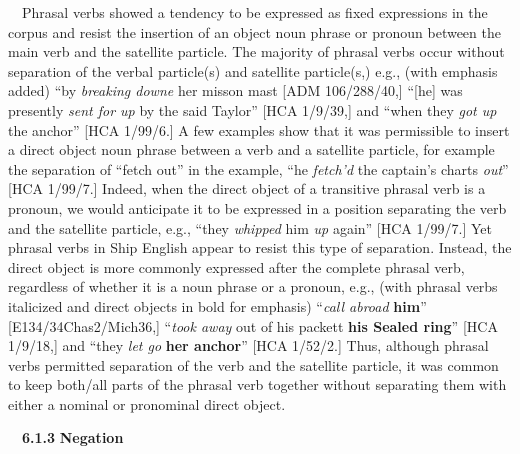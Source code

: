 \begin{styleStandard}
\ \ Phrasal verbs showed a tendency to be expressed as fixed expressions in the corpus and resist the insertion of an object noun phrase or pronoun between the main verb and the satellite particle. The majority of phrasal verbs occur without separation of the verbal particle(s) and satellite particle(s,) e.g., (with emphasis added) “by \textit{breaking downe} her misson mast{\textquotedbl} [ADM 106/288/40,] “[he] was presently \textit{sent for up} by the said Taylor” [HCA 1/9/39,] and “when they \textit{got up} the anchor” [HCA 1/99/6.] A few examples show that it was permissible to insert a direct object noun phrase between a verb and a satellite particle, for example the separation of “fetch out” in the example, “he \textit{fetch’d} the captain’s charts \textit{out}” [HCA 1/99/7.] Indeed, when the direct object of a transitive phrasal verb is a pronoun, we would anticipate it to be expressed in a position separating the verb and the satellite particle, e.g., “they \textit{whipped} him \textit{up} again” [HCA 1/99/7.] Yet phrasal verbs in Ship English appear to resist this type of separation. Instead, the direct object is more commonly expressed after the complete phrasal verb, regardless of whether it is a noun phrase or a pronoun, e.g., (with phrasal verbs italicized and direct objects in bold for emphasis) “\textit{call abroad} \textbf{him}” [E134/34Chas2/Mich36,] “\textit{took away} out of his packett \textbf{his Sealed ring}” [HCA 1/9/18,] and “they \textit{let go} \textbf{her anchor}” [HCA 1/52/2.] Thus, although phrasal verbs permitted separation of the verb and the satellite particle, it was common to keep both/all parts of the phrasal verb together without separating them with either a nominal or pronominal direct object. 
\end{styleStandard}

\begin{styleStandard}
\ \ \textbf{6.1.3} \textbf{Negation}
\end{styleStandard}

